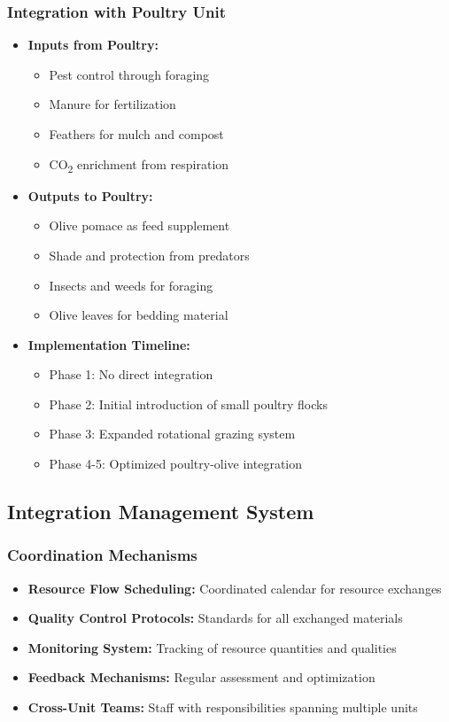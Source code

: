 \subsubsection{Integration with Poultry Unit}
\begin{itemize}
    \item \textbf{Inputs from Poultry:}
    \begin{itemize}
        \item Pest control through foraging
        \item Manure for fertilization
        \item Feathers for mulch and compost
        \item CO\textsubscript{2} enrichment from respiration
    \end{itemize}
    
    \item \textbf{Outputs to Poultry:}
    \begin{itemize}
        \item Olive pomace as feed supplement
        \item Shade and protection from predators
        \item Insects and weeds for foraging
        \item Olive leaves for bedding material
    \end{itemize}
    
    \item \textbf{Implementation Timeline:}
    \begin{itemize}
        \item Phase 1: No direct integration
        \item Phase 2: Initial introduction of small poultry flocks
        \item Phase 3: Expanded rotational grazing system
        \item Phase 4-5: Optimized poultry-olive integration
    \end{itemize}
\end{itemize}

\subsection{Integration Management System}

\subsubsection{Coordination Mechanisms}
\begin{itemize}
    \item \textbf{Resource Flow Scheduling:} Coordinated calendar for resource exchanges
    \item \textbf{Quality Control Protocols:} Standards for all exchanged materials
    \item \textbf{Monitoring System:} Tracking of resource quantities and qualities
    \item \textbf{Feedback Mechanisms:} Regular assessment and optimization
    \item \textbf{Cross-Unit Teams:} Staff with responsibilities spanning multiple units
\end{itemize}

